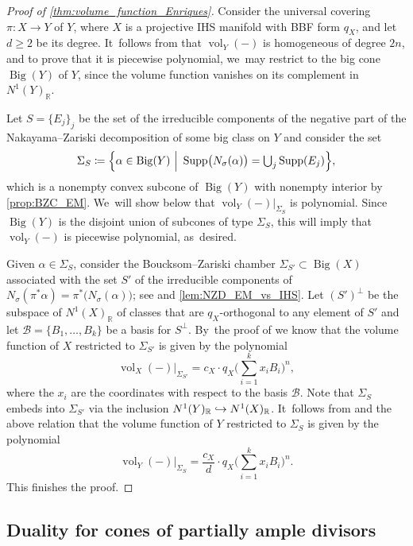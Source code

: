 \documentclass[10pt]{amsart}
\newcommand\hto{\mathrel{\lhook\joinrel\to}}
\let\ts\textstyle
\theoremstyle{plain}
\theoremstyle{definition}
\newcommand{\R}{\mathbb{R}}
\DeclareMathOperator{\Supp}{Supp}
\DeclareMathOperator{\vol}{vol}
\DeclareMathOperator{\BgCn}{\mathrm{Big}}
\begin{document}
\begin{proof}[Proof of \autoref{thm:volume_function_Enriques}]
Consider the universal covering $\pi \colon X \to Y$ of $Y$, where $X$ is a projective IHS manifold with BBF form $q_X$, and let $d \geq 2$ be its degree. It~follows from \cite[Prop.\,2.2.35]{Laz04book_I} that $\vol_Y(-)$ is homogeneous of degree $2n$, and to prove that it is piecewise polynomial, we~may restrict to the big cone $\BgCn(Y)$ of $Y$, since the volume function vanishes on its complement in $N^1(Y)_\R$.

Let $S = \{ E_j \}_j$ be the set of the irreducible components of the negative part of the Nakayama--Zariski decomposition of some big class on $Y$ and consider the set
\[\ts
\Sigma_S \coloneqq \Bigl\{ \alpha \in \BgCn(Y) \ \Big| \ \Supp \bigl(N_{\sigma}(\alpha) \bigr) = \bigcup_j \Supp(E_j) \Bigr\},
\]
which is a nonempty convex subcone of $\BgCn(Y)$ with nonempty interior by \autoref{prop:BZC_EM}. We~will show below that $\vol_Y(-) |_{\Sigma_S}$ is polynomial. Since $\BgCn(Y)$ is the disjoint union of subcones of type $\Sigma_S$, this will imply that $\vol_Y(-)$ is piecewise polynomial, as~desired.

Given $\alpha \in \Sigma_S$, consider the Boucksom--Zariski chamber $\Sigma_{S'} \subset \BgCn(X)$ associated with the set $S'$ of the irreducible components of $N_\sigma(\pi^*\alpha) = \pi^* \bigl(N_{\sigma}(\alpha) \bigr)$; see \cite[Def.\,4.11]{Denisi23} and \autoref{lem:NZD_EM_vs_IHS}. Let $(S')^{\perp}$ be the subspace of $N^1(X)_\R$ of classes that are $q_X$-orthogonal to any element of $S'$ and let $\mathcal{B} = \{B_1,\dots,B_k\}$ be a basis for $S^{\perp}$. By~the proof of \cite[Th.\,1.6(2)]{Denisi23} we know that the volume function of $X$ restricted to $\Sigma_{S'}$ is given by the polynomial
\[
\vol_{X}(-) \big\vert_{\Sigma_{S'}} = c_X \cdot q_X \biggl(\sum_{i=1}^k x_i B_i \biggr)^n,
\]
where the $x_i$ are the coordinates with respect to the basis $\mathcal{B}$.
Note that $\Sigma_S$ embeds into $\Sigma_{S'}$ via the inclusion $N^1(Y)_\R \hto N^1(X)_\R$. It~follows from \cite[Prop.\,2.9(1)]{Kuronya06} and the above relation that the volume function of $Y$ restricted to $\Sigma_S$ is given by the polynomial
\[
\vol_{Y}(-) \big\vert_{\Sigma_S} = \frac{c_X}{d} \cdot q_X \biggl(\sum_{i=1}^k x_i B_i \biggr)^n.
\]
This finishes the proof.
\end{proof}

\subsection{Duality for cones of partially ample divisors}
\label{subsection:duality}
\end{document}
